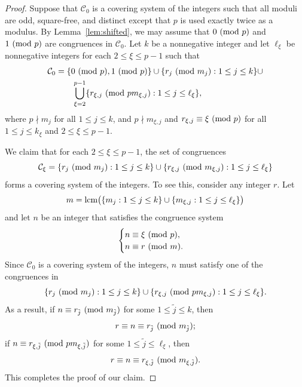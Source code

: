 \documentclass[12pt]{article}
\theoremstyle{definition}
\newcommand{\lcm}{\textup{lcm}}
\renewcommand{\mod}[2]{#1\textup{ (mod }#2\textup{)}}
\begin{document}
\begin{proof}
Suppose that $\mathcal{C}_0$ is a covering system of the integers such that all moduli are odd, square-free, and distinct except that $p$ is used exactly twice as a modulus. By Lemma~\ref{lem:shifted}, we may assume that $\mod{0}{p}$ and $\mod{1}{p}$ are congruences in $\mathcal{C}_0$. Let $k$ be a nonnegative integer and let $\ell_\xi$ be nonnegative integers for each $2\leq\xi\leq p-1$ such that
\begin{align*}
\mathcal{C}_0&=\{\mod{0}{p},\mod{1}{p}\}\cup\{\mod{r_j}{m_j}:1\leq j\leq k\}\cup\\
&\hspace{20pt}\bigcup_{\xi=2}^{p-1}\{\mod{r_{\xi,j}}{pm_{\xi,j}}:1\leq j\leq\ell_\xi\},
\end{align*}
where $p\nmid m_j$ for all $1\leq j\leq k$, and $p\nmid m_{\xi,j}$ and $r_{\xi,j}\equiv\mod{\xi}{p}$ for all $1\leq j\leq k_\xi$ and $2\leq\xi\leq p-1$.

We claim that for each $2\leq\xi\leq p-1$, the set of congruences 
$$\mathcal{C}_\xi=\{\mod{r_j}{m_j}:1\leq j\leq k\}\cup\{\mod{r_{\xi,j}}{m_{\xi,j}}:1\leq j\leq\ell_\xi\}$$
forms a covering system of the integers. To see this, consider any integer $r$. Let
$$m=\lcm\big(\{m_j:1\leq j\leq k\}\cup\{m_{\xi,j}:1\leq j\leq\ell_\xi\}\big)$$
and let $n$ be an integer that satisfies the congruence system
$$\begin{cases}
n\equiv\mod{\xi}{p},\\
n\equiv\mod{r}{m}.
\end{cases}$$
Since $\mathcal{C}_0$ is a covering system of the integers, $n$ must satisfy one of the congruences in
$$
\{\mod{r_j}{m_j}:1\leq j\leq k\}\cup\{\mod{r_{\xi,j}}{pm_{\xi,j}}:1\leq j\leq\ell_\xi\}.$$
As a result, if $n\equiv\mod{r_{\tilde{j}}}{m_{\tilde{j}}}$ for some $1\leq\tilde{j}\leq k$, then
$$r\equiv n\equiv\mod{r_{\tilde{j}}}{m_{\tilde{j}}};$$
if $n\equiv\mod{r_{\xi,\tilde{j}}}{pm_{\xi,\tilde{j}}}$ for some $1\leq\tilde{j}\leq\ell_\xi$, then
$$r\equiv n\equiv\mod{r_{\xi,\tilde{j}}}{m_{\xi,\tilde{j}}}.$$
This completes the proof of our claim.


\end{proof}
\end{document}

